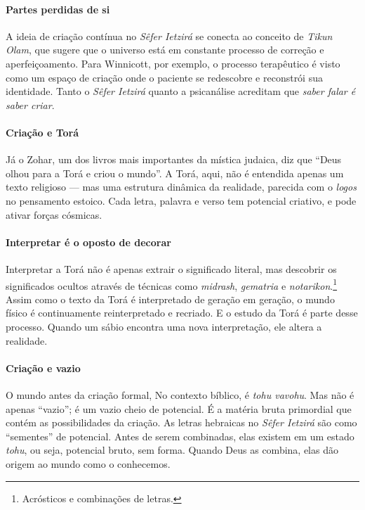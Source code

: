 \paragraph{Partes perdidas de si} A ideia de criação contínua no \textit{Sêfer Ietzirá} se conecta ao conceito de \textit{Tikun Olam}, que sugere que o universo está em constante processo de correção e aperfeiçoamento. Para Winnicott, por exemplo, o processo terapêutico é visto como um espaço de criação onde o paciente se redescobre e reconstrói sua identidade. Tanto o \textit{Sêfer Ietzirá} quanto a psicanálise acreditam que \textit{saber falar é saber criar}.

\paragraph{Criação e Torá} Já o Zohar, um dos livros mais importantes da mística judaica, diz que ``Deus olhou para a Torá e criou o mundo''. A Torá, aqui, não é entendida apenas um texto religioso --- mas uma estrutura dinâmica da realidade, parecida com o \textit{logos} no pensamento estoico. Cada letra, palavra e verso tem potencial criativo, e pode ativar forças cósmicas.

\paragraph{Interpretar é o oposto de decorar} Interpretar a Torá não é apenas extrair o significado literal, mas descobrir os significados ocultos através de técnicas como \textit{midrash}, \textit{gematria} e \textit{notarikon}.\footnote{Acrósticos e combinações de letras.} Assim como o texto da Torá é interpretado de geração em geração, o mundo físico é continuamente reinterpretado e recriado. E o estudo da Torá é parte desse processo. Quando um sábio encontra uma nova interpretação, ele altera a realidade.

\paragraph{Criação e vazio} O mundo antes da criação formal, No contexto bíblico, é \textit{tohu vavohu}. Mas não é apenas ``vazio''; é um vazio cheio de potencial. É a matéria bruta primordial que contém as possibilidades da criação. As letras hebraicas no \textit{Sêfer Ietzirá} são como “sementes” de potencial. Antes de serem combinadas, elas existem em um estado \textit{tohu}, ou seja, potencial bruto, sem forma. Quando Deus as combina, elas dão origem ao mundo como o conhecemos.

